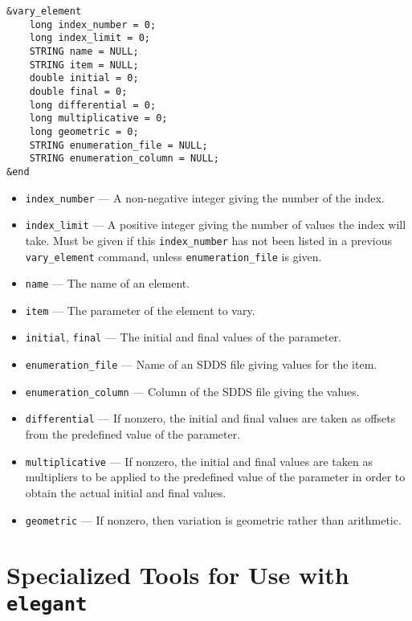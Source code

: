 \documentclass[11pt]{article}
\begin{document}
\begin{verbatim}
&vary_element
    long index_number = 0;
    long index_limit = 0;
    STRING name = NULL;
    STRING item = NULL;
    double initial = 0;
    double final = 0;
    long differential = 0;
    long multiplicative = 0;
    long geometric = 0;
    STRING enumeration_file = NULL;
    STRING enumeration_column = NULL;
&end
\end{verbatim}

\begin{itemize}
\item \verb|index_number| --- A non-negative integer giving the number of the index.
\item \verb|index_limit| --- A positive integer giving the number of values the index will take.
 Must be given if this \verb|index_number| has not been listed in a previous \verb|vary_element|
command, unless \verb|enumeration_file| is given.
\item \verb|name| --- The name of an element.
\item \verb|item| --- The parameter of the element to vary.
\item \verb|initial|, \verb|final| --- The initial and final values of the parameter.
\item \verb|enumeration_file| --- Name of an SDDS file giving values for the item.
\item \verb|enumeration_column| --- Column of the SDDS file giving the values.
\item \verb|differential| --- If nonzero, the initial and final values are taken as
offsets from the predefined value of the parameter.
\item \verb|multiplicative| --- If nonzero, the initial and final values are taken as 
multipliers to be applied to the predefined value of the parameter in order to obtain
the actual initial and final values.
\item \verb|geometric| --- If nonzero, then variation is geometric rather than 
arithmetic.
\end{itemize}

\newpage
\section{Specialized Tools for Use with {\tt elegant}}
\end{document}
